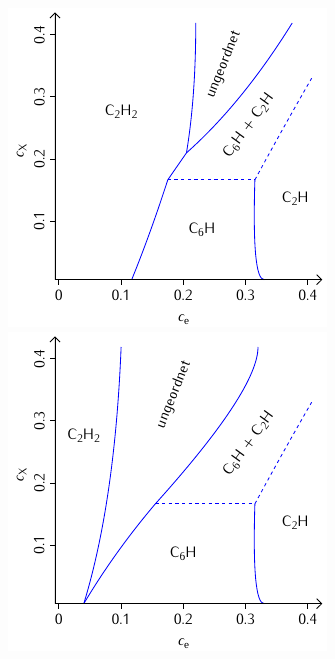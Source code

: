 \documentclass[a4paper, 10pt, twoside, openany]{book} %
\begin{document}
	\begin{figure}
		\begin{minipage}[b]{0.48\textwidth}
			\includegraphics[width=\textwidth]{Abbildungen/Phasendiagramme/Schemata/H.pdf}
		\end{minipage}
		\hfill
		\begin{minipage}[b]{0.48\textwidth}
			\includegraphics[width=\textwidth]{Abbildungen/Phasendiagramme/Schemata/H_penalty.pdf}
		\end{minipage}
		

\end{figure}
\end{document}

